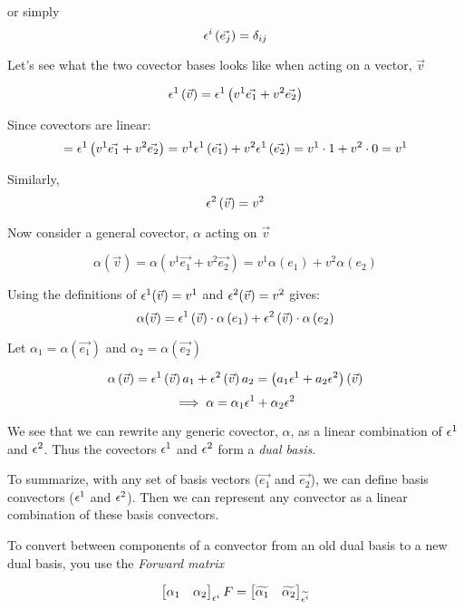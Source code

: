 \documentclass{report}
\begin{document}
or simply
$$ \epsilon^i\left( \vec{e_j} \right) = \delta_{ij} $$ 

Let's see what the two covector bases looks like when acting on a vector, $\vec{v}$

$$ \epsilon^1\left(\vec{v} \right) = \epsilon^1 \left( v^1 \vec{e_1} + v^2 \vec{e_2} \right)   $$ 

Since covectors are linear:
$$  = \epsilon^1 \left( v^1 \vec{e_1} + v^2 \vec{e_2} \right) = v^1 \epsilon^1 \left( \vec{e_1} \right) + v^2 \epsilon^1 \left( \vec{e_2} \right) = v^1 \cdot 1 + v^2 \cdot 0 = v^1 $$ 

Similarly, 
$$ \epsilon^2\left( \vec{v} \right)  = v^2 $$ 

Now consider a general covector, $\alpha$ acting on $\vec{v}$

$$ \alpha\left( \vec{v} \right) = \alpha \left( v^1 \vec{e_1} + v^2 \vec{e_2} \right) = v^1 \alpha(e_1) + v^2 \alpha (e_2)  $$

Using the definitions of $\epsilon^1(\vec{v}) = v^1$ and $\epsilon^2 (\vec{v}) = v^2$ gives:
$$ \alpha(\vec{v}) = \epsilon^1 \left( \vec{v} \right)\cdot \alpha\left( e_1 \right)  + \epsilon^2\left( \vec{v} \right) \cdot \alpha \left( e_2 \right)    $$

Let $\alpha_1 = \alpha(\vec{e_1})$ and $\alpha_2 = \alpha(\vec{e_2})$

$$ \alpha\left( \vec{v} \right) = \epsilon^1 \left( \vec{v} \right) a_1 + \epsilon^2 \left( \vec{v} \right) a_2  = \left( a_1 \epsilon^1 + a_2 \epsilon^2 \right)\left( \vec{v} \right)  $$ 
$$ \implies \alpha = \alpha_1 \epsilon^1 + \alpha_2 \epsilon^2$$ 

We see that we can rewrite any generic covector, $\alpha$, as a linear combination of $\epsilon^1$ and $\epsilon^2$. Thus the covectors $\epsilon^1$ and $\epsilon^2$ form a \emph{dual basis}.

To summarize, with any set of basis vectors ($\vec{e_1}$ and $\vec{e_2}$), we can define basis convectors ($\epsilon^1$ and $\epsilon^2$). Then we can represent any convector as a linear combination of these basis convectors.

To convert between components of a convector from an old dual basis to a new dual basis, you use the \emph{Forward matrix}

$$ \begin{bmatrix} \alpha_1 & \alpha_2 \end{bmatrix}_{\epsilon^i} F = \begin{bmatrix} \widetilde{\alpha_1} & \widetilde{\alpha_2} \end{bmatrix}_{\widetilde{\epsilon^i}}   $$ 
\end{document}
